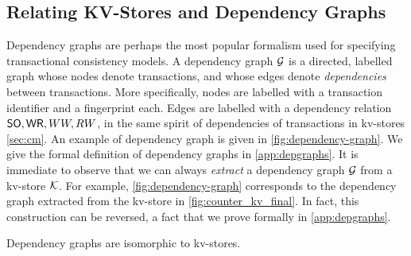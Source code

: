 \subsection{Relating KV-Stores and Dependency Graphs}
\label{sec:dep_graphs}
Dependency graphs \cite{adya-icde,adya} are perhaps the most popular 
formalism used for specifying transactional consistency models. 
A dependency graph $\mathcal{G}$ is a directed, labelled graph whose 
nodes denote transactions, and whose edges denote \emph{dependencies} between transactions.  
More specifically, nodes are labelled with a transaction identifier and a fingerprint each.
Edges are labelled with a dependency relation $\mathsf{SO}, \mathsf{WR}, WW, RW$, in the 
same spirit of dependencies of transactions in kv-stores \cref{sec:cm}.
An example of dependency graph is given in \cref{fig:dependency-graph}.
%
We give the formal definition of dependency graphs in \cref{app:depgraphs}.
It is immediate to observe that we can always \emph{extract} a dependency graph  $\mathcal{G}$ from a kv-store $\mathcal{K}$.
For example, \cref{fig:dependency-graph} corresponds to the dependency graph extracted from the kv-store in \cref{fig:counter_kv_final}.
In fact, this construction can be reversed, a fact that we prove formally in \cref{app:depgraphs}.
\begin{theorem}
\label{thm:kv_graph_isomorph}
Dependency graphs are isomorphic to kv-stores.
\end{theorem}


